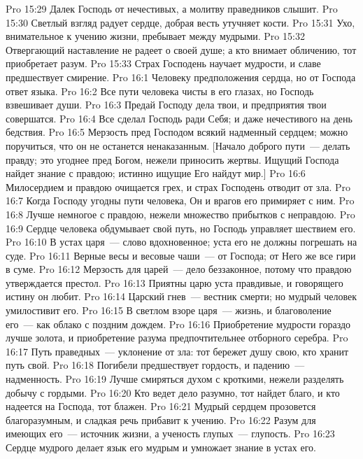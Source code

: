 \vs Pro 15:29 Далек Господь от нечестивых, а молитву праведников слышит.
\vs Pro 15:30 Светлый взгляд радует сердце, добрая весть утучняет кости.
\vs Pro 15:31 Ухо, внимательное к учению жизни, пребывает между мудрыми.
\vs Pro 15:32 Отвергающий наставление не радеет о своей душе; а кто внимает обличению, тот приобретает разум.
\vs Pro 15:33 Страх Господень научает мудрости, и славе предшествует смирение.
\vs Pro 16:1 Человеку  предположения сердца, но от Господа ответ языка.
\vs Pro 16:2 Все пути человека чисты в его глазах, но Господь взвешивает души.
\vs Pro 16:3 Предай Господу дела твои, и предприятия твои совершатся.
\vs Pro 16:4 Все сделал Господь ради Себя; и даже нечестивого  на день бедствия.
\vs Pro 16:5 Мерзость пред Господом всякий надменный сердцем; можно поручиться, что он не останется ненаказанным. [Начало доброго пути~--- делать правду; это угоднее пред Богом, нежели приносить жертвы. Ищущий Господа найдет знание с правдою; истинно ищущие Его найдут мир.]
\vs Pro 16:6 Милосердием и правдою очищается грех, и страх Господень отводит от зла.
\vs Pro 16:7 Когда Господу угодны пути человека, Он и врагов его примиряет с ним.
\vs Pro 16:8 Лучше немногое с правдою, нежели множество прибытков с неправдою.
\vs Pro 16:9 Сердце человека обдумывает свой путь, но Господь управляет шествием его.
\vs Pro 16:10 В устах царя~--- слово вдохновенное; уста его не должны погрешать на суде.
\vs Pro 16:11 Верные весы и весовые чаши~--- от Господа; от Него же все гири в суме.
\vs Pro 16:12 Мерзость для царей~--- дело беззаконное, потому что правдою утверждается престол.
\vs Pro 16:13 Приятны царю уста правдивые, и говорящего истину он любит.
\vs Pro 16:14 Царский гнев~--- вестник смерти; но мудрый человек умилостивит его.
\vs Pro 16:15 В светлом взоре царя~--- жизнь, и благоволение его~--- как облако с поздним дождем.
\vs Pro 16:16 Приобретение мудрости гораздо лучше золота, и приобретение разума предпочтительнее отборного серебра.
\vs Pro 16:17 Путь праведных~--- уклонение от зла: тот бережет душу свою, кто хранит путь свой.
\vs Pro 16:18 Погибели предшествует гордость, и падению~--- надменность.
\vs Pro 16:19 Лучше смиряться духом с кроткими, нежели разделять добычу с гордыми.
\vs Pro 16:20 Кто ведет дело разумно, тот найдет благо, и кто надеется на Господа, тот блажен.
\vs Pro 16:21 Мудрый сердцем прозовется благоразумным, и сладкая речь прибавит к учению.
\vs Pro 16:22 Разум для имеющих его~--- источник жизни, а ученость глупых~--- глупость.
\vs Pro 16:23 Сердце мудрого делает язык его мудрым и умножает знание в устах его.
